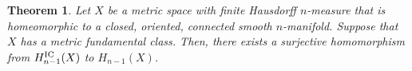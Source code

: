 \documentclass{amsart}
\newtheorem{theorem}{Theorem}[section]
\numberwithin{equation}{section}
\newcommand{\bb}[1]{\llbracket #1\rrbracket}
\newcommand{\norm}[1]{\lVert#1\rVert}
\begin{document}

    \begin{theorem}\label{thme: codimension-one-homology}
        Let $X$ be a metric space with finite Hausdorff $n$-measure that is homeomorphic to a closed, oriented, connected smooth $n$-manifold. Suppose that $X$ has a metric fundamental class. Then, there exists a surjective homomorphism from $H_{n-1}^\textup{IC}(X)$ to $H_{n-1}(X)$.
    \end{theorem}
    
\end{document}
